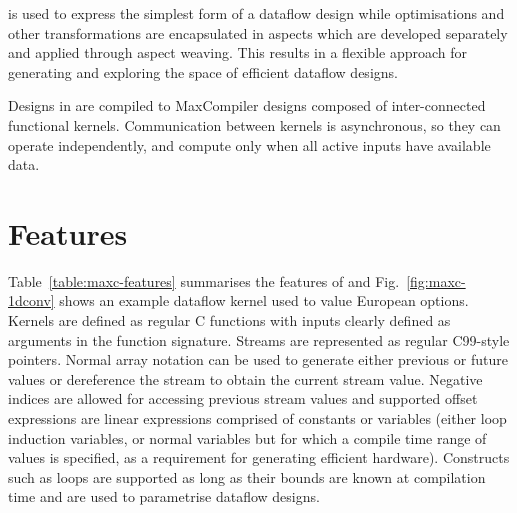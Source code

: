 \FAST{} is used to express the simplest form of a dataflow design
while optimisations and other transformations are encapsulated in
aspects which are developed separately and applied through aspect
weaving. This results in a flexible approach for generating and
exploring the space of efficient dataflow designs.

Designs in \FAST{} are compiled to MaxCompiler designs composed of
inter-connected functional kernels. Communication between kernels is
asynchronous, so they can operate independently, and compute only when
all active inputs have available data.

\section{Features}

Table~\ref{table:maxc-features} summarises the features of \FAST{} and
Fig.~\ref{fig:maxc-1dconv} shows an example dataflow kernel used to
value European options. Kernels are defined as regular C functions
with inputs clearly defined as arguments in the function
signature. Streams are represented as regular C99-style pointers.
Normal array notation can be used to generate either previous or
future values or dereference the stream to obtain the current stream
value. Negative indices are allowed for accessing previous stream
values and supported offset expressions are linear expressions
comprised of constants or variables (either loop induction variables,
or normal variables but for which a compile time range of values is
specified, as a requirement for generating efficient
hardware). Constructs such as loops are supported as long as their
bounds are known at compilation time and are used to parametrise
dataflow designs.

